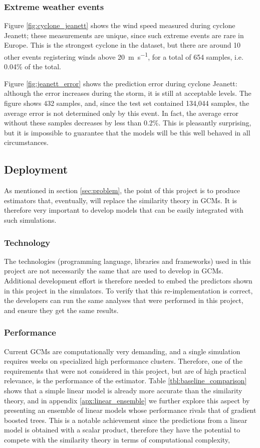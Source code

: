\documentclass[a4paper,11pt]{kth-mag}
\begin{document}
\subsubsection{Extreme weather events} Figure \ref{fig:cyclone_jeanett} shows the wind speed measured during cyclone Jeanett; these measurements are unique, since such extreme events are rare in Europe. This is the strongest cyclone in the dataset, but there are around 10 other events registering winds above \SI{20}{\meter\per\second}, for a total of 654 samples, i.e. 0.04\% of the total.

Figure \ref{fig:jeanett_error} shows the prediction error during cyclone Jeanett: although the error increases during the storm, it is still at acceptable levels. The figure shows 432 samples, and, since the test set contained 134,044 samples, the average error is not determined only by this event. In fact, the average error without these samples decreases by less than 0.2\%. This is pleasantly surprising, but it is impossible to guarantee that the models will be this well behaved in all circumstances.


\subsection{Deployment}
As mentioned in section \ref{sec:problem}, the point of this project is to produce estimators that, eventually, will replace the similarity theory in GCMs. It is therefore very important to develop models that can be easily integrated with such simulations.

\subsubsection{Technology} The technologies (programming language, libraries and frameworks) used in this project are not necessarily the same that are used to develop in GCMs. Additional development effort is therefore needed to embed the predictors shown in this project in the simulators. To verify that this re-implementation is correct, the developers can run the same analyses that were performed in this project, and ensure they get the same results.

\subsubsection{Performance} Current GCMs are computationally very demanding, and a single simulation requires weeks on specialized high performance clusters. Therefore, one of the requirements that were not considered in this project, but are of high practical relevance, is the performance of the estimator. Table \ref{tbl:baseline_comparison} shows that a simple linear model is already more accurate than the similarity theory, and in appendix \ref{apx:linear_ensemble} we further explore this aspect by presenting an ensemble of linear models whose performance rivals that of gradient boosted trees. This is a notable achievement since the predictions from a linear model is obtained with a scalar product, therefore they have the potential to compete with the similarity theory in terms of computational complexity,
\end{document}
